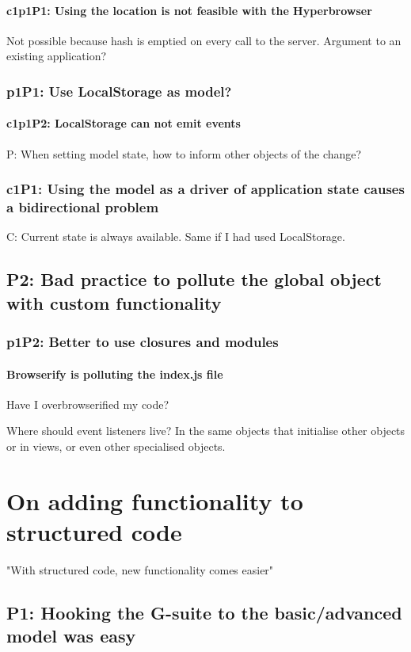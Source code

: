 \documentclass[english]{ifimaster}
\begin{document}
\subsubsection{c1p1P1: Using the location is not feasible with the Hyperbrowser}
Not possible because hash is emptied on every call to the server. Argument to an existing application?
\subsection{p1P1: Use LocalStorage as model?}

\subsubsection{c1p1P2: LocalStorage can not emit events}
P: When setting model state, how to inform other objects of the change?

\subsection{c1P1: Using the model as a driver of application state causes a bidirectional problem}

C: Current state is always available. Same if I had used LocalStorage.
\section{P2: Bad practice to pollute the global object with custom functionality}
\subsection{p1P2: Better to use closures and modules}
\subsubsection{Browserify is polluting the index.js file}
Have I overbrowserified my code?

Where should event listeners live? In the same objects that initialise other objects or in views, or even other specialised objects.

\chapter{On adding functionality to structured code}
"With structured code, new functionality comes easier"
\section{P1: Hooking the G-suite to the basic/advanced model was easy}
\end{document}
